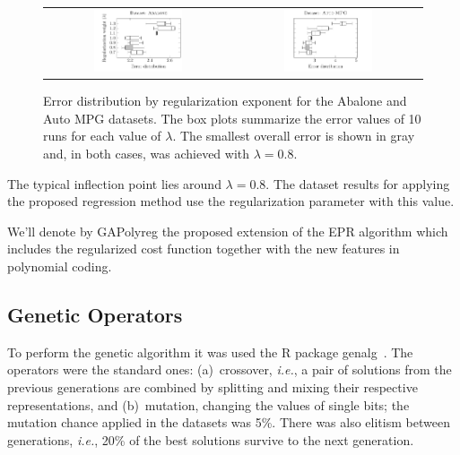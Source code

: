 \documentclass[preprint,authoryear,12pt]{elsarticle}
\begin{document}
%
\begin{figure}[tb]\begin{center}
\begin{tabular}{cc}
\includegraphics[width=0.49\textwidth]{figure_1a.pdf}
%
&
%
%
\includegraphics[width=0.49\textwidth]{figure_1b.pdf}
\end{tabular}

\caption{Error distribution by regularization exponent for the Abalone and Auto MPG datasets. The box plots summarize the error values of 10 runs for each value of $\lambda$. The smallest overall error is shown in gray and, in both cases, was achieved with $\lambda=0.8$.}
\label{Abalone_dataset_lambdas}\label{Auto-MPG_dataset_lambdas}

\end{center}\end{figure}

The typical inflection point lies around $\lambda = 0.8$. The dataset results for applying the proposed regression method use the regularization parameter with this value.

We'll denote by \ac{GAPolyreg} the proposed extension of the EPR algorithm which includes the regularized cost function together with the new features in polynomial coding.

\subsection{Genetic Operators}

To perform the genetic algorithm it was used the R package genalg~\citep{willighage2012genalg}. The operators were the standard ones: (a)~crossover, \emph{i.e.}, a pair of solutions from the previous generations are combined by splitting and mixing their respective representations, and (b)~mutation, changing the values of single bits; the mutation chance applied in the datasets was 5\%. There was also elitism between generations, \emph{i.e.}, 20\% of the best solutions survive to the next generation.
\end{document}
